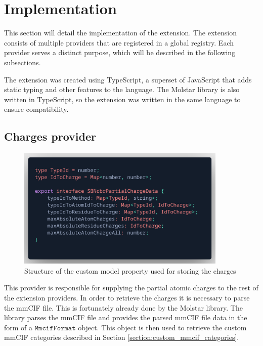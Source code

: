 \documentclass[
  digital,     %
  oneside,     %
  nosansbold,  %
  nocolorbold, %
  lof,         %
  lot,         %
]{fithesis4}
\begin{document}
\section{Implementation}
\label{section:implementation}

This section will detail the implementation of the extension. The extension consists of multiple providers that are registered in a global registry. Each provider serves a distinct purpose, which will be described in the following subsections.

The extension was created using TypeScript, a superset of JavaScript that adds static typing and other features to the language. The Molstar library is also written in TypeScript, so the extension was written in the same language to ensure compatibility.

\subsection{Charges provider}
\label{subsection:charges_provider}

\begin{figure}
  \begin{center}
    \includegraphics[width=10cm]{figures/charge_data_structure.png}
  \end{center}
  \caption{Structure of the custom model property used for storing the charges}
  \label{figure:charge_data_structure}
\end{figure}

This provider is responsible for supplying the partial atomic charges to the rest of the extension providers.
In order to retrieve the charges it is necessary to parse the mmCIF file.
This is fortunately already done by the Molstar library.
The library parses the mmCIF file and provides the parsed mmCIF file data in the form of a $\texttt{MmcifFormat}$ object.
This object is then used to retrieve the custom mmCIF categories described in Section \ref{section:custom_mmcif_categories}.
\end{document}

